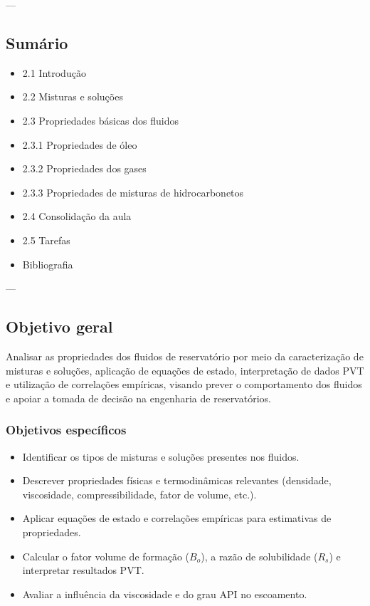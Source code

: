 \documentclass[11pt,a4paper]{article}
\begin{document}
---

\subsection{Sumário}
\begin{itemize}
\item 2.1 Introdução
\item 2.2 Misturas e soluções
\item 2.3 Propriedades básicas dos fluidos
\item 2.3.1 Propriedades de óleo
\item 2.3.2 Propriedades dos gases
\item 2.3.3 Propriedades de misturas de hidrocarbonetos
\item 2.4 Consolidação da aula
\item 2.5 Tarefas
\item Bibliografia
\end{itemize}

---

\subsection{Objetivo geral}
Analisar as propriedades dos fluidos de reservatório por meio da caracterização de misturas e soluções, aplicação de equações de estado, interpretação de dados PVT e utilização de correlações empíricas, visando prever o comportamento dos fluidos e apoiar a tomada de decisão na engenharia de reservatórios.

\subsubsection{Objetivos específicos}
\begin{itemize}
\item Identificar os tipos de misturas e soluções presentes nos fluidos.
\item Descrever propriedades físicas e termodinâmicas relevantes (densidade, viscosidade, compressibilidade, fator de volume, etc.).
\item Aplicar equações de estado e correlações empíricas para estimativas de propriedades.
\item Calcular o fator volume de formação ($B_o$), a razão de solubilidade ($R_s$) e interpretar resultados PVT.
\item Avaliar a influência da viscosidade e do grau API no escoamento.
\end{itemize}
\end{document}
